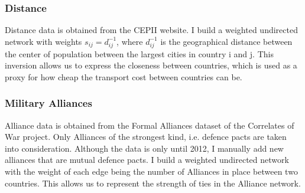 \documentclass[a4paper, 12pt]{article}
\begin{document}
\subsubsection{Distance}
Distance data is obtained from the CEPII website\cite{CEPII}.
I build a weighted undirected network with weights $s_{ij} = d_{ij}^{-1}$, where $d_{ij}^{-1}$ is the geographical distance between the center of population between the largest cities in country i and j.
This inversion allows us to express the closeness between countries, which is used as a proxy for how cheap the transport cost between countries can be.

\subsubsection{Military Alliances}
Alliance data is obtained from the Formal Alliances dataset of the Correlates of War project\cite{COW}.
Only Alliances of the strongest kind, i.e. defence pacts are taken into consideration.
Although the data is only until 2012, I manually add new alliances that are mutual defence pacts\cite{Franco-Greek}.
I build a weighted undirected network with the weight of each edge being the number of Alliances in place between two countries.
This allows us to represent the strength of ties in the Alliance network.
\newpage
\end{document}
